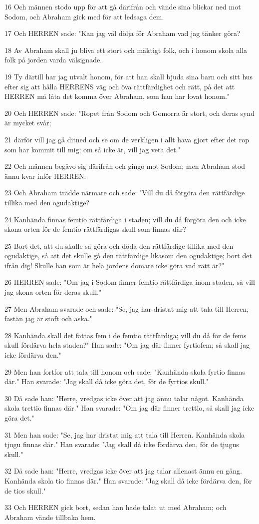 \par 16 Och männen stodo upp för att gå därifrån och vände sina blickar ned mot Sodom, och Abraham gick med för att ledsaga dem.
\par 17 Och HERREN sade: "Kan jag väl dölja för Abraham vad jag tänker göra?
\par 18 Av Abraham skall ju bliva ett stort och mäktigt folk, och i honom skola alla folk på jorden varda välsignade.
\par 19 Ty därtill har jag utvalt honom, för att han skall bjuda sina barn och sitt hus efter sig att hålla HERRENS väg och öva rättfärdighet och rätt, på det att HERREN må låta det komma över Abraham, som han har lovat honom."
\par 20 Och HERREN sade: "Ropet från Sodom och Gomorra är stort, och deras synd är mycket svår;
\par 21 därför vill jag gå ditned och se om de verkligen i allt hava gjort efter det rop som har kommit till mig; om så icke är, vill jag veta det."
\par 22 Och männen begåvo sig därifrån och gingo mot Sodom; men Abraham stod ännu kvar inför HERREN.
\par 23 Och Abraham trädde närmare och sade: "Vill du då förgöra den rättfärdige tillika med den ogudaktige?
\par 24 Kanhända finnas femtio rättfärdiga i staden; vill du då förgöra den och icke skona orten för de femtio rättfärdigas skull som finnas där?
\par 25 Bort det, att du skulle så göra och döda den rättfärdige tillika med den ogudaktige, så att det skulle gå den rättfärdige likasom den ogudaktige; bort det ifrån dig! Skulle han som är hela jordens domare icke göra vad rätt är?"
\par 26 HERREN sade: "Om jag i Sodom finner femtio rättfärdiga inom staden, så vill jag skona orten för deras skull."
\par 27 Men Abraham svarade och sade: "Se, jag har dristat mig att tala till Herren, fastän jag är stoft och aska."
\par 28 Kanhända skall det fattas fem i de femtio rättfärdiga; vill du då för de fems skull fördärva hela staden?" Han sade: "Om jag där finner fyrtiofem; så skall jag icke fördärva den."
\par 29 Men han fortfor att tala till honom och sade: "Kanhända skola fyrtio finnas där." Han svarade: "Jag skall då icke göra det, för de fyrtios skull."
\par 30 Då sade han: "Herre, vredgas icke över att jag ännu talar något. Kanhända skola trettio finnas där." Han svarade: "Om jag där finner trettio, så skall jag icke göra det."
\par 31 Men han sade: "Se, jag har dristat mig att tala till Herren. Kanhända skola tjugu finnas där." Han svarade: "Jag skall då icke fördärva den, för de tjugus skull."
\par 32 Då sade han: "Herre, vredgas icke över att jag talar allenast ännu en gång. Kanhända skola tio finnas där." Han svarade: "Jag skall då icke fördärva den, för de tios skull."
\par 33 Och HERREN gick bort, sedan han hade talat ut med Abraham; och Abraham vände tillbaka hem.

